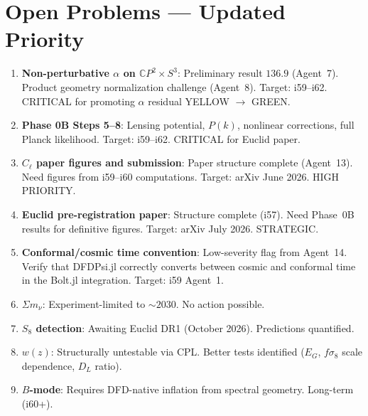\documentclass[11pt,a4paper]{article}
\newcommand{\CP}{\mathbb{C}P}
\begin{document}
\section{Open Problems --- Updated Priority}
\label{sec:open}

\begin{enumerate}[label=\textbf{P\arabic*.}]
\item \textbf{Non-perturbative $\alpha$ on $\CP^2 \times S^3$}: Preliminary result $136.9$ (Agent~7). Product geometry normalization challenge (Agent~8). Target: i59--i62. CRITICAL for promoting $\alpha$ residual YELLOW $\to$ GREEN.

\item \textbf{Phase 0B Steps 5--8}: Lensing potential, $P(k)$, nonlinear corrections, full Planck likelihood. Target: i59--i62. CRITICAL for Euclid paper.

\item \textbf{$C_\ell$ paper figures and submission}: Paper structure complete (Agent~13). Need figures from i59--i60 computations. Target: arXiv June 2026. HIGH PRIORITY.

\item \textbf{Euclid pre-registration paper}: Structure complete (i57). Need Phase~0B results for definitive figures. Target: arXiv July 2026. STRATEGIC.

\item \textbf{Conformal/cosmic time convention}: Low-severity flag from Agent~14. Verify that DFDPsi.jl correctly converts between cosmic and conformal time in the Bolt.jl integration. Target: i59 Agent~1.

\item \textbf{$\Sigma m_\nu$}: Experiment-limited to $\sim 2030$. No action possible.

\item \textbf{$S_8$ detection}: Awaiting Euclid DR1 (October 2026). Predictions quantified.

\item \textbf{$w(z)$}: Structurally untestable via CPL. Better tests identified ($E_G$, $f\sigma_8$ scale dependence, $D_L$ ratio).

\item \textbf{$B$-mode}: Requires DFD-native inflation from spectral geometry. Long-term (i60+).
\end{enumerate}
\end{document}
